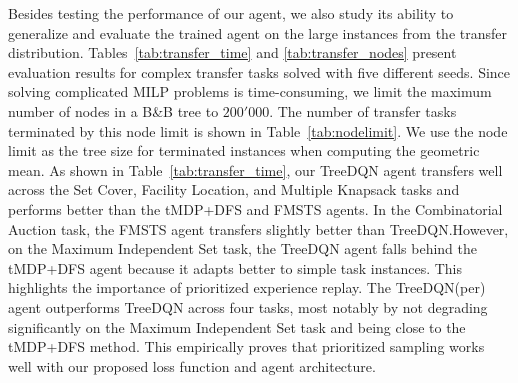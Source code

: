 \documentclass[preprint,12pt]{elsarticle} %
\theoremstyle{plain}
\theoremstyle{definition}
\theoremstyle{remark}
\begin{document}
\begin{table}[t]
\caption{Geometric mean of tree size with geometric std for transfer tasks.}\label{tab:transfer_nodes}
\begin{center}
\end{center}
\end{table}



Besides testing the performance of our agent, we also study its ability to generalize and evaluate the trained agent on the large instances from the transfer distribution. Tables~\ref{tab:transfer_time} and \ref{tab:transfer_nodes} present evaluation results for complex transfer tasks solved with five different seeds. Since solving complicated MILP problems is time-consuming, we limit the maximum number of nodes in a B\&B tree to $200'000$. The number of transfer tasks terminated by this node limit is shown in Table~\ref{tab:nodelimit}. We use the node limit as the tree size for terminated instances when computing the geometric mean. As shown in Table~\ref{tab:transfer_time}, our TreeDQN agent transfers well across the Set Cover, Facility Location, and Multiple Knapsack tasks and performs better than the tMDP+DFS and FMSTS agents. In the Combinatorial Auction task, the FMSTS agent transfers slightly better than TreeDQN.However, on the Maximum Independent Set task, the TreeDQN agent falls behind the tMDP+DFS agent because it adapts better to simple task instances. This highlights the importance of prioritized experience replay. The TreeDQN(per) agent outperforms TreeDQN across four tasks, most notably by not degrading significantly on the Maximum Independent Set task and being close to the tMDP+DFS method. This empirically proves that prioritized sampling works well with our proposed loss function and agent architecture. 
\end{document}
